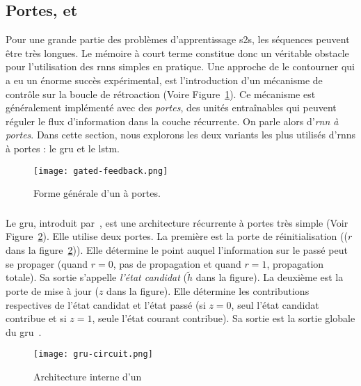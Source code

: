 \subsection{Portes,  et }

Pour une grande partie des problèmes d'apprentissage \gls{s2s}, les séquences peuvent être très longues.
Le mémoire à court terme constitue donc un véritable obstacle pour l'utilisation des \glspl{rnn} simples en pratique.
Une approche de le contourner qui a eu un énorme succès expérimental, 
est l'introduction d'un mécanisme de contrôle sur la boucle de rétroaction (Voire Figure~\ref{fig.rnn-gate}).
Ce mécanisme est généralement implémenté avec des \emph{portes},
des unités entraînables qui peuvent réguler le flux d'information dans la couche récurrente.
On parle alors d'\emph{\gls{rnn} à portes}.
Dans cette section, nous explorons les deux variants les plus utilisés d'\glspl{rnn} à portes :
le \gls{gru} et le \gls{lstm}. 


\begin{figure}[htb]
    \begin{center}
        \texttt{[image: gated-feedback.png]}
    \end{center}
    \caption{Forme générale d'un  à portes.}
    \label{fig.rnn-gate}
\end{figure}

\subsubsection{}

Le \gls{gru}, introduit par~\cite{Cho_van_Merrienboer_Bahdanau_Bengio_2014}, 
est une architecture récurrente à portes très simple (Voir Figure~\ref{fig.gru-circuit}).
Elle utilise deux portes.
La première est la porte de réinitialisation ((\(r\) dans la figure~\ref{fig.gru-circuit})).
Elle détermine le point auquel l'information sur le passé peut se propager
(quand \(r=0\), pas de propagation et quand \(r=1\), propagation totale).
Sa sortie s'appelle \emph{l'état candidat} (\(\tilde{h}\) dans la figure).
La deuxième est la porte de mise à jour (\(z\) dans la figure).
Elle détermine les contributions respectives de l'état candidat et l'état passé
(si \(z=0\), seul l'état candidat contribue et si \(z=1\), seule l'état courant contribue).
Sa sortie est la sortie globale du \gls{gru}~\cite{Cho_van_Merrienboer_Bahdanau_Bengio_2014}.


\begin{figure}[htb]
    \begin{center}
        \texttt{[image: gru-circuit.png]}
    \end{center}
    \caption{Architecture interne d'un ~\cite[Fig. 1b]{Chung_Gulcehre_Cho_Bengio_2014}}
    \label{fig.gru-circuit}
\end{figure}

